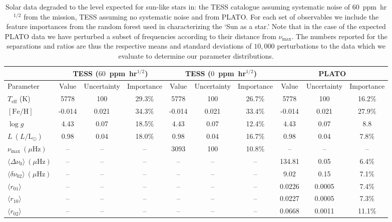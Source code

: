 {\begin{landscape}
\begin{figure}
\end{figure}
\begin{table} %
\centering
\caption{Solar data degraded to the level expected for sun-like stars in: the TESS catalogue assuming systematic  noise of $60$~ppm~hr$^{1/2}$ from the mission, TESS assuming no systematic noise and from PLATO. For each set of observables we include the feature importances from the random forest used in characterizing the `Sun as a star.' Note that in the case of the expected PLATO data we have perturbed a subset of frequencies according to their distance from $\nu_{\max}$. The numbers reported for the separations and ratios are thus the respective means and standard deviations of $10,000$ perturbations to the data which we evaluate to determine our parameter distributions. \label{tab:tpl}} 
\begin{tabular}{l|ccc|ccc|ccc}
\multicolumn{1}{c}{} &
\multicolumn{3}{c}{TESS ($60$~ppm~hr$^{1/2}$)}   &
\multicolumn{3}{|c|}{TESS ($0$~ppm~hr$^{1/2}$)}   &
\multicolumn{3}{c}{PLATO} \\\hline
Parameter  &
Value &
Uncertainty &  
Importance &
Value &
Uncertainty &
Importance &
Value &
Uncertainty &
Importance \\\hline
$T_{\text{eff}}$ (K) & 5778 &100 &29.3\% & 5778 &100 &26.7\%& 5778 &100 &16.2\%\\
$[\text{Fe/H}]$ &-0.014 &0.021 &34.3\% &-0.014 &0.021 &33.4\% &-0.014 &0.021 &27.9\%\\
$\log{} g$ &4.43 &0.07 &18.5\% &4.43 &0.07 &12.4\% &4.43 &0.07 &8.8\\
$L \ (L/\text{L}_{\odot})$   &0.98  &0.04 &18.0\% &0.98  &0.04  &16.7\% &0.98  &0.04  &7.8\%\\
$\nu_{\max} \ (\mu \text{Hz})$  & -- & -- & -- &3093 &100 &10.8\% & -- &-- & --\\
$\langle\Delta\nu_0\rangle  \ (\mu \text{Hz})$  & -- & -- & -- & -- & -- & -- &134.81 &0.05 &6.4\%\\
$\langle\delta\nu_{02}\rangle  \ (\mu \text{Hz})$  & -- & -- & -- & -- & -- & -- &9.02 &0.15 &7.1\% \\
$\langle r_{01}\rangle$ & -- & -- & -- & -- & -- & -- &0.0226 &0.0005 &7.4\%\\
$\langle r_{10}\rangle$ & -- & -- & -- & -- & -- & -- &0.0227 &0.0005 &7.3\% \\
$\langle r_{02}\rangle$& -- & -- & -- & -- & -- & -- &0.0668 &0.0011 & 11.1\%
\end{tabular}
\end{table}
\end{landscape}
}


